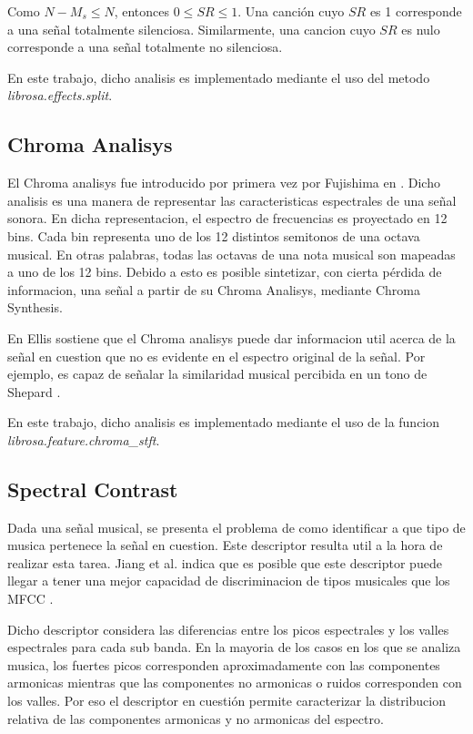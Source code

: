 \documentclass[]{article}
\begin{document}
\begin{multicols}{2}
Como $N-M_s\leq N$, entonces $0 \leq SR \leq 1$.
Una canción cuyo $SR$ es 1 corresponde a una señal totalmente silenciosa.
Similarmente, una cancion cuyo $SR$ es nulo corresponde a una señal totalmente
no silenciosa.

En este trabajo, dicho analisis es implementado mediante el uso del metodo
\emph{{librosa.effects.split}}.

\subsection{Chroma Analisys}
\label{Sec:Chroma}
El Chroma analisys fue introducido por primera vez por Fujishima en \cite{fujishima1999realtime}.
Dicho analisis es una manera de representar las caracteristicas espectrales
de una señal sonora. En dicha representacion, el espectro de frecuencias es
proyectado en 12 bins. Cada bin representa uno de los 12 distintos semitonos
de una octava musical. En otras palabras, todas las octavas de una nota musical
son mapeadas a uno de los 12 bins. Debido a esto es posible sintetizar, con cierta
pérdida de informacion, una señal a partir de su Chroma Analisys, mediante Chroma
Synthesis.

En \cite{Ellis} Ellis sostiene que el Chroma analisys puede dar informacion
util acerca de la señal en cuestion que no es evidente en el espectro original de
la señal. Por ejemplo, es capaz de señalar la similaridad musical percibida en
un tono de Shepard \cite{bello}.

En este trabajo, dicho analisis es implementado mediante el uso de la funcion \emph{{librosa.feature.chroma\_stft}}.
\subsection{Spectral Contrast}
Dada una señal musical, se presenta el problema de como identificar a que tipo de
musica pertenece la señal en cuestion. Este descriptor resulta util a la hora de
realizar esta tarea. Jiang et al. indica que es posible que este descriptor puede llegar
a tener una mejor capacidad de discriminacion de tipos musicales que los MFCC
\cite{DanNingJiang}.

Dicho descriptor considera las diferencias entre los picos espectrales y los valles
espectrales para cada sub banda. En la mayoria de los casos en los que se analiza
musica, los fuertes picos corresponden aproximadamente con las componentes armonicas
mientras que las componentes no armonicas o ruidos corresponden con los valles.
Por eso el descriptor en cuestión permite caracterizar la distribucion relativa
de las componentes armonicas y no armonicas del espectro.


\end{multicols}
\end{document}
